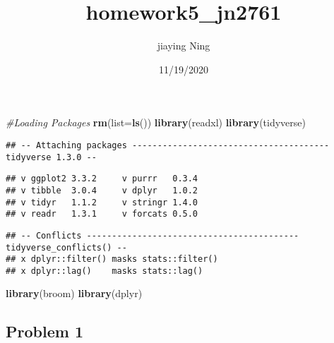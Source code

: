 \documentclass[]{article}
\title{homework5\_jn2761}
\author{jiaying Ning}
\date{11/19/2020}
\newenvironment{Shaded}{\begin{snugshade}}{\end{snugshade}}
\newcommand{\CommentTok}[1]{\textcolor[rgb]{0.56,0.35,0.01}{\textit{#1}}}
\newcommand{\DataTypeTok}[1]{\textcolor[rgb]{0.13,0.29,0.53}{#1}}
\newcommand{\KeywordTok}[1]{\textcolor[rgb]{0.13,0.29,0.53}{\textbf{#1}}}
\newcommand{\NormalTok}[1]{#1}
\newcommand{\OperatorTok}[1]{\textcolor[rgb]{0.81,0.36,0.00}{\textbf{#1}}}
\newcommand{\StringTok}[1]{\textcolor[rgb]{0.31,0.60,0.02}{#1}}
\begin{document}
\maketitle

\begin{Shaded}
\begin{Highlighting}[]
\CommentTok{#Loading Packages}
\KeywordTok{rm}\NormalTok{(}\DataTypeTok{list=}\KeywordTok{ls}\NormalTok{())}
\KeywordTok{library}\NormalTok{(readxl)}
\KeywordTok{library}\NormalTok{(tidyverse)}
\end{Highlighting}
\end{Shaded}

\begin{verbatim}
## -- Attaching packages --------------------------------------- tidyverse 1.3.0 --
\end{verbatim}

\begin{verbatim}
## v ggplot2 3.3.2     v purrr   0.3.4
## v tibble  3.0.4     v dplyr   1.0.2
## v tidyr   1.1.2     v stringr 1.4.0
## v readr   1.3.1     v forcats 0.5.0
\end{verbatim}

\begin{verbatim}
## -- Conflicts ------------------------------------------ tidyverse_conflicts() --
## x dplyr::filter() masks stats::filter()
## x dplyr::lag()    masks stats::lag()
\end{verbatim}

\begin{Shaded}
\begin{Highlighting}[]
\KeywordTok{library}\NormalTok{(broom)}
\KeywordTok{library}\NormalTok{(dplyr)}
\end{Highlighting}
\end{Shaded}

\hypertarget{problem-1}{%
\subsection{Problem 1}\label{problem-1}}

\begin{Shaded}
\end{Shaded}
\end{document}
